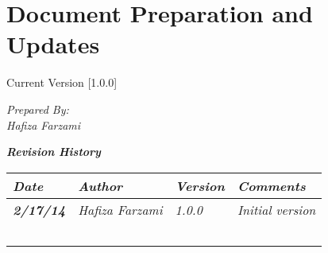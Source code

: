 
\chapter{Document Preparation and Updates}

Current Version [1.0.0]
\vspace*{5mm}

{\color{MSBlue3}
\noindent
\textit{Prepared By:}\\
\textit{Hafiza Farzami}\\
}

\vfill
\noindent
{\color{color02} \textit{\textbf{Revision History}}}\\
\begin{tabular}{|>{\raggedright}p{1.5cm}|>{\raggedright}p{3cm}|>{\raggedright}p{1.5cm}|>{\raggedright}p{9cm}|}
\hline
\textit{\textbf{Date}} &  \textit{\textbf{Author}} & \textit{\textbf{Version}} & \textit{\textbf{Comments}}\tabularnewline
\hline
 \textit{\textbf{2/17/14}} & \textit{Hafiza Farzami} & \textit{1.0.0} & \textit{Initial version}\tabularnewline
\hline
 &  &  & \tabularnewline
 \hline
 &  &  & \tabularnewline
\hline
 &  &  & \tabularnewline
\hline
 &  &  & \tabularnewline
\hline
 &  &  & \tabularnewline
\hline
\end{tabular}
\vfill

